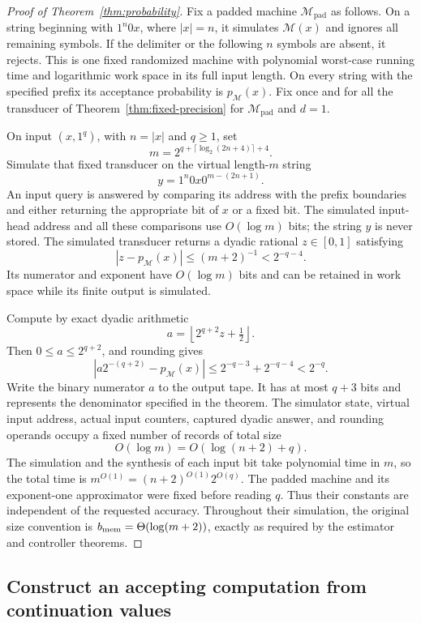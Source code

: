 \documentclass[11pt]{article}
\numberwithin{equation}{section}
\theoremstyle{definition}
\theoremstyle{remark}
\begin{document}
\begin{proof}[Proof of Theorem~\ref{thm:probability}]
Fix a padded machine $\mathcal M_{\mathrm{pad}}$ as follows. On a string
beginning with $1^n0x$, where $|x|=n$, it simulates $\mathcal M(x)$
and ignores all remaining symbols. If the delimiter or the following
$n$ symbols are absent, it rejects. This is one fixed randomized
machine with polynomial worst-case running time and logarithmic work
space in its full input length. On every string with the specified
prefix its acceptance probability is $p_{\mathcal M}(x)$.
Fix once and for all the transducer of
Theorem~\ref{thm:fixed-precision} for $\mathcal M_{\mathrm{pad}}$ and $d=1$.

On input $(x,1^q)$, with $n=|x|$ and $q\ge1$, set
\[
 m=2^{q+\lceil\log_2(2n+4)\rceil+4}.
\]
Simulate that fixed transducer on the virtual length-$m$ string
\[
 y=1^n0x0^{m-(2n+1)}.
\]
An input query is answered by comparing its address with the prefix
boundaries and either returning the appropriate bit of $x$ or a
fixed bit. The simulated input-head address and all these comparisons
use $O(\log m)$ bits; the string $y$ is never stored. The simulated
transducer returns a dyadic rational $z\in[0,1]$ satisfying
\[
 |z-p_{\mathcal M}(x)|\le(m+2)^{-1}<2^{-q-4}.
\]
Its numerator and exponent have $O(\log m)$ bits and can be retained
in work space while its finite output is simulated.

Compute by exact dyadic arithmetic
\[
 a=\left\lfloor 2^{q+2}z+\tfrac12\right\rfloor.
\]
Then $0\le a\le2^{q+2}$, and rounding gives
\[
 \left|a2^{-(q+2)}-p_{\mathcal M}(x)\right|
 \le2^{-q-3}+2^{-q-4}<2^{-q}.
\]
Write the binary numerator $a$ to the output tape. It has at most
$q+3$ bits and represents the denominator specified in the theorem.
The simulator state, virtual input address, actual input counters,
captured dyadic answer, and rounding operands occupy a fixed number
of records of total size
\[
 O(\log m)=O(\log(n+2)+q).
\]
The simulation and the synthesis of each input bit take polynomial
time in $m$, so the total time is
$m^{O(1)}=(n+2)^{O(1)}2^{O(q)}$.
The padded machine and its exponent-one approximator were fixed
before reading $q$. Thus their constants are independent of the
requested accuracy. Throughout their simulation, the original size
convention is ${b_{\rm mem}}=\Theta(\log(m+2))$, exactly as required by the
estimator and controller theorems.
\end{proof}

\subsection{Construct an accepting computation from continuation values}
\end{document}
